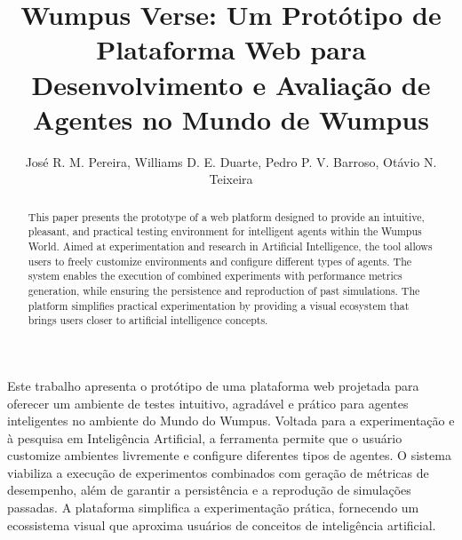 \documentclass[12pt]{article}
\title{Wumpus Verse: Um Protótipo de Plataforma Web para Desenvolvimento e Avaliação de Agentes no Mundo de Wumpus}
\author{José R. M. Pereira\inst{1}, Williams D. E. Duarte\inst{2}, Pedro P. V. Barroso\inst{3}, Otávio N. Teixeira\inst{4}}
\begin{document}
 

\maketitle

\begin{abstract}
  This paper presents the prototype of a web platform designed to provide an intuitive, pleasant, and practical testing environment for intelligent agents within the Wumpus World. Aimed at experimentation and research in Artificial Intelligence, the tool allows users to freely customize environments and configure different types of agents. The system enables the execution of combined experiments with performance metrics generation, while ensuring the persistence and reproduction of past simulations. The platform simplifies practical experimentation by providing a visual ecosystem that brings users closer to artificial intelligence concepts.
\end{abstract}
     
\begin{resumo} 
  Este trabalho apresenta o protótipo de uma plataforma web projetada para oferecer um ambiente de testes intuitivo, agradável e prático para agentes inteligentes no ambiente do Mundo do Wumpus. Voltada para a experimentação e à pesquisa em Inteligência Artificial, a ferramenta permite que o usuário customize ambientes livremente e configure diferentes tipos de agentes. O sistema viabiliza a execução de experimentos combinados com geração de métricas de desempenho, além de garantir a persistência e a reprodução de simulações passadas. A plataforma simplifica a experimentação prática, fornecendo um ecossistema visual que aproxima usuários de conceitos de inteligência artificial.
\end{resumo}













\end{document}
